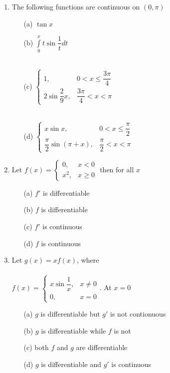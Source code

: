\documentclass[journal,12pt,twocolumn]{IEEEtran}
\begin{document}
\begin{enumerate}
\item The following functions are continuous on $(0,\pi)$
\begin{itemize}
\item[(a)] $\tan x$ \\
\item[(b)] $\int\limits_0^xt\sin\dfrac{1}{t}dt$\\ \\
\item[(c)] $\begin{cases}
1, & \text{$0<x\leq\dfrac{3\pi}{4}$} \\
2\sin\dfrac{2}{9}x, & \text{$\dfrac{3\pi}{4}<x<\pi$}
\end{cases}$ \\ \\
\item[(d)] $\begin{cases}
x\sin x, & \text{$0<x\leq\dfrac{\pi}{2}$} \\
\dfrac{\pi}{2}\sin (\pi+x), & \text{$\dfrac{\pi}{2}<x<\pi$}
\end{cases}$
\end{itemize}

\item Let $f(x)=\begin{cases}
0, & \text{$x<0$}\\
x^2, & \text{$x\geq 0$}
\end{cases}$ then for all $x$
\begin{itemize}
\item[(a)] $f'$ is differentiable \item[(b)] $f$ is differentiable \item[(c)] $f'$ is continuous \item[(d)] $f$ is continuous
\end{itemize}

\item Let $g(x)=xf(x)$, where \\
\\$f(x)=\begin{cases}
x\sin\dfrac{1}{x}, & \text{$x\ne 0$}\\
0, & \text{$x=0$}
\end{cases}$. At $x=0$ \\
\begin{itemize}
\item[(a)] $g$ is differentiable but $g'$ is not contionuous
\item[(b)] $g$ is differentiable while $f$ is not
\item[(c)] both $f$ and $g$ are differentiable
\item[(d)] $g$ is differentiable and $g'$ is continuous \\
\end{itemize}


\end{enumerate}
\end{document}
